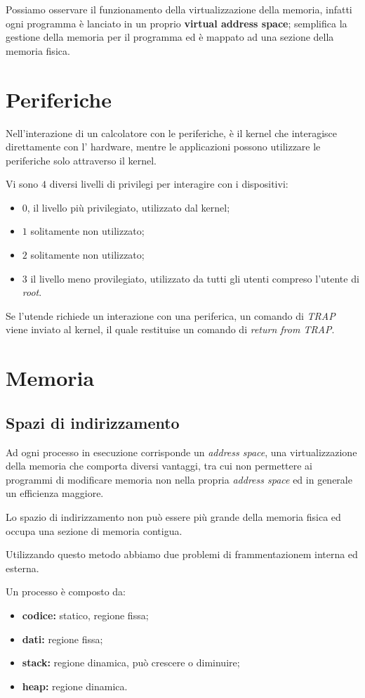Possiamo osservare il funzionamento della virtualizzazione della memoria,
infatti ogni programma è lanciato in un proprio \textbf{virtual address space};
semplifica la gestione della memoria per il programma ed è mappato ad una
sezione della memoria fisica.

\section{Periferiche}
Nell'interazione di un calcolatore con le periferiche, è il kernel che
interagisce direttamente con l' hardware, mentre le applicazioni possono
utilizzare le periferiche solo attraverso il kernel.


Vi sono $4$ diversi livelli di privilegi per interagire con i dispositivi:
\begin{itemize}
  \item $0$, il livello più privilegiato, utilizzato dal kernel;
  \item $1$ solitamente non utilizzato;
  \item $2$ solitamente non utilizzato;
  \item $3$ il livello meno provilegiato, utilizzato da tutti gli utenti
    compreso l'utente di \emph{root}.
\end{itemize}

Se l'utende richiede un interazione con una periferica, un comando di
\emph{TRAP} viene inviato al kernel, il quale restituise un comando di
\emph{return from TRAP}.

\section{Memoria}
\subsection{Spazi di indirizzamento}
Ad ogni processo in esecuzione corrisponde un \emph{address space}, una
virtualizzazione della memoria che comporta diversi vantaggi, tra cui non
permettere ai programmi di modificare memoria non nella propria \emph{address
space} ed in generale un efficienza maggiore.

Lo spazio di indirizzamento non può essere più grande della memoria fisica ed
occupa una sezione di memoria contigua.

Utilizzando questo metodo abbiamo due problemi di frammentazionem interna ed
esterna.


Un processo è composto da:
\begin{itemize}
  \item \textbf{codice:} statico, regione fissa;
  \item \textbf{dati:} regione fissa;
  \item \textbf{stack:} regione dinamica, può crescere o diminuire;
  \item \textbf{heap:} regione dinamica.
\end{itemize}



